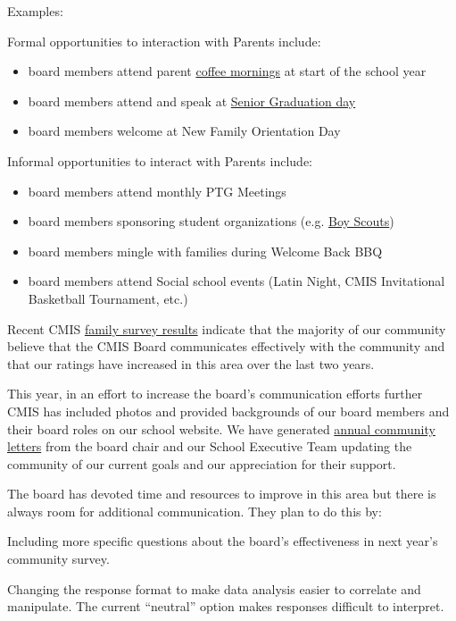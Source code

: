 \begin{findings}
Examples:

Formal opportunities to interaction with Parents include:
\begin{itemize}
\item board members attend parent \href{https://drive.google.com/a/cmis.ac.th/file/d/0Bwny3HLdIIS7d1FGeDhaZE1EcG1PMHlMX2NRZTdIYXlWZERB/view?usp=sharing}{coffee mornings} at start of the school year
\item board members attend and speak at \href{https://drive.google.com/a/cmis.ac.th/file/d/0Bwny3HLdIIS7NGpoVEtlWmw2RE0/view?usp=sharing}{Senior Graduation day}
\item board members welcome at New Family Orientation Day
\end{itemize}

Informal opportunities to interact with Parents include:
\begin{itemize}
\item board members attend monthly PTG Meetings
\item board members sponsoring student organizations (e.g. \href{https://drive.google.com/a/cmis.ac.th/file/d/0Bwny3HLdIIS7WXpial9KYjFlWFBBQW1YQ2thOVpsTTFCeGVr/view?usp=sharing}{Boy Scouts})
\item board members mingle with families during Welcome Back BBQ
\item board members attend Social school events (Latin Night, CMIS Invitational Basketball Tournament, etc.)
\end{itemize}


Recent CMIS \href{https://docs.google.com/a/cmis.ac.th/document/d/1_otvw47y3Z-1CSjXnKhgRTauVRqPl1S6nSdmsb00O2k/edit?usp=sharing}{family survey results} indicate that the majority of our community believe that the CMIS Board communicates effectively with the community and that our ratings have increased in this area over the last two years.

This year, in an effort to increase the board's communication efforts further CMIS has included photos and provided backgrounds of our board members and their board roles on our school website. We have generated \href{https://drive.google.com/a/cmis.ac.th/file/d/0Bwny3HLdIIS7MjJMX1ZIVS1zSXJOaTNZcFRmTWV1Q1VTc1hZ/view?usp=sharing}{annual community letters} from the board chair and our School Executive Team updating the community of our current goals and our appreciation for their support.


The board has devoted time and resources to improve in this area but there is always room for additional communication. They plan to do this by:

Including more specific questions about the board’s effectiveness in next year’s community survey. 

Changing the response format to make data analysis easier to correlate and manipulate. The current ``neutral'' option makes responses difficult to interpret.
\end{findings}

